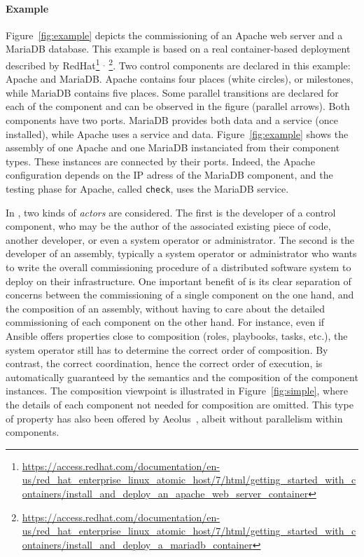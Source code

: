 \paragraph{Example}{ Figure~\ref{fig:example} depicts the \mad
  commissioning of an Apache web server and a MariaDB database. This
  example is based on a real container-based deployment described by
  RedHat\footnote{\url{https://access.redhat.com/documentation/en-us/red_hat_enterprise_linux_atomic_host/7/html/getting_started_with_containers/install_and_deploy_an_apache_web_server_container}}%
  $^,$%
  \footnote{\url{https://access.redhat.com/documentation/en-us/red_hat_enterprise_linux_atomic_host/7/html/getting_started_with_containers/install_and_deploy_a_mariadb_container}}. Two
  \mad control components are declared in this example: Apache and
  MariaDB. Apache contains four places (white circles), or
  milestones, while MariaDB contains five places. Some parallel
  transitions are declared for each of the component and can be
  observed in the figure (parallel arrows). Both components have two
  ports. MariaDB provides both data and a service (once installed),
  while Apache uses a service and data. Figure~\ref{fig:example}
  shows the assembly of one Apache and one MariaDB instanciated from
  their component types. These instances are connected by their
  ports. Indeed, the Apache configuration depends on the IP adress of the
  MariaDB component, and the testing phase for Apache, called
  \texttt{check}, uses the MariaDB service.}

In \mad, two kinds of \emph{actors} are considered. The first is the
developer of a control component, who may be the author of the
associated existing piece of code, another developer, or even a
system operator or administrator. The second is the developer of an assembly,
typically a system operator or administrator who wants to write
the overall commissioning procedure of a distributed software system
to deploy on their infrastructure. One important benefit of \mad is
its clear separation of concerns between the commissioning of a single
component on the one hand, and the composition of an assembly, without
having to care about the detailed commissioning of each component on
the other hand. For instance, even if Ansible offers properties close
to composition (\eg roles, playbooks, tasks, etc.), the system operator
still has to determine the correct order of composition. By contrast, the
correct coordination, hence the correct order of execution, is
automatically guaranteed by the \mad semantics and the composition of
the component instances. The composition viewpoint is illustrated in
Figure~\ref{fig:simple}, where the details of each component not
needed for composition are omitted. This type of property has also been offered by
Aeolus~\cite{}, albeit without parallelism within components.

